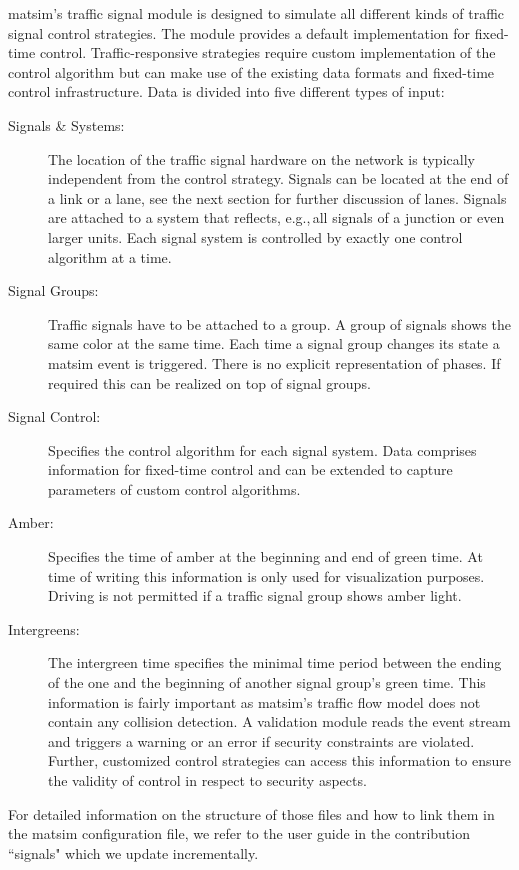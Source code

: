 \gls{matsim}'s traffic signal module is designed to simulate all different kinds of traffic signal control strategies. 
The module provides a default implementation for fixed-time control. 
Traffic-responsive strategies require custom implementation of the control algorithm but can make use of the existing data formats and fixed-time control infrastructure. 
Data is divided into five different types of input:
\begin{description}
	\item[Signals \& Systems:] The location of the traffic signal hardware on the network is typically independent from the control strategy. 
		Signals can be located at the end of a link or a lane, see the next section for further discussion of lanes. Signals are attached to a system that reflects, e.g.,\,all signals of a junction or even larger units. 
		Each signal system is controlled by exactly one control algorithm at a time.  
	\item[Signal Groups:] Traffic signals have to be attached to a group. 
		A group of signals shows the same color at the same time. 
		Each time a signal group changes its state a \gls{matsim} event is triggered. 
		There is no explicit representation of phases. 
		If required this can be realized on top of signal groups.  
	\item[Signal Control:] Specifies the control algorithm for each signal system. 
		Data comprises information for fixed-time control and can be extended to capture parameters of custom control algorithms. 
	\item[Amber:] Specifies the time of amber at the beginning and end of green time. 
		At time of writing this information is only used for visualization purposes. 
		Driving is not permitted if a traffic signal group shows amber light. 
	\item[Intergreens:] The intergreen time specifies the minimal time period between the ending of the one and the beginning of another signal group's green time.  
		This information is fairly important as \gls{matsim}'s traffic flow model does not contain any collision detection. 
		A validation module reads the event stream and triggers a warning or an error if security constraints are violated. 
		Further, customized control strategies can access this information to ensure the validity of control in respect to security aspects.    
\end{description}

For detailed information on the structure of those files and how to link them in the \gls{matsim} configuration file, we refer to the user guide in the contribution ``signals" which we update incrementally.

